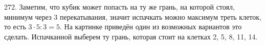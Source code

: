 272. Заметим, что кубик может попасть на ту же грань, на которой стоял, минимум через 3 перекатывания, значит испачкать можно максимум треть клеток, то есть $3\cdot5:3=5.$ На картинке приведён один из возможных вариантов это сделать. Испачканной выберем ту грань, которая стоит на клетках 2, 5, 8, 11, 14.
\begin{center}
\begin{figure}[ht!]
\end{figure}
\end{center}
\newpage\noindent
